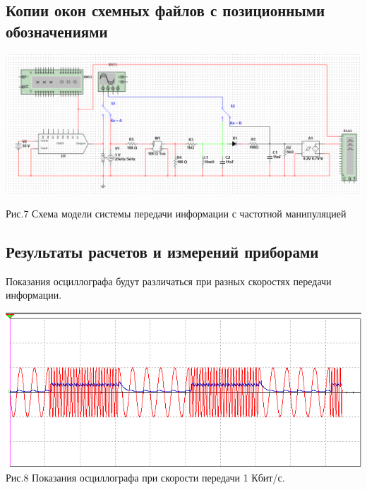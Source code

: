 \documentclass[11pt]{article}
\begin{document}
\subsection{Копии окон схемных файлов с позиционными обозначениями}
\includegraphics[width=1\linewidth]{img/scheme3.png}
\begin{center}
    Рис.7 Схема модели системы передачи информации с частотной манипуляцией
\end{center}

\subsection{Результаты расчетов и измерений приборами}
Показания осциллографа будут различаться при разных скоростях передачи информации.
\begin{center}
    \includegraphics[width=1\linewidth]{img/osc31.png}
        Рис.8 Показания осциллографа при скорости передачи 1 Кбит/с.
\end{center}
\end{document}
